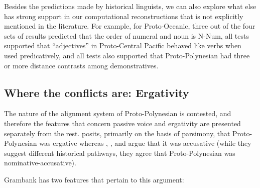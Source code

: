 \documentclass[draft,10pt]{article} %
\begin{document}
%
%

Besides the predictions made by historical linguists, we can also explore what else has strong support in our computational reconstructions that is not explicitly mentioned in the literature. For example, for Proto-Oceanic, three out of the four sets of results predicted that the order of numeral and noun is N-Num, all tests supported that ``adjectives'' in Proto-Central Pacific behaved like verbs when used predicatively, and all tests also supported that Proto-Polynesian had three or more distance contrasts among demonstratives. 

\subsection{Where the conflicts are: Ergativity}
The nature of the alignment system of Proto-Polynesian is contested, and therefore the features that concern passive voice and ergativity are presented separately from the rest. \citet{clark1976aspects} posits, primarily on the basis of parsimony, that Proto-Polynesian was ergative whereas \citet{hale_1968}, \citet{hohepa_1967,hohepa_1969}, and \citet{chung1978} argue that it was accusative (while they suggest different historical pathways, they agree that Proto-Polynesian was nominative-accusative).

Grambank has two features that pertain to this argument:
\end{document}
